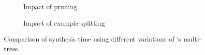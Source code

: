 \begin{figure}[t]
    \centering
    
    \begin{subfigure}[t]{0.47\textwidth}
         \centering
         \caption{Impact of pruning}
         \label{fig:mt_vs_nopruning}
     \end{subfigure}
     \hfill%
     \begin{subfigure}[t]{0.47
\textwidth}
         \centering
         \caption{Impact of example-splitting}
         \label{fig:mt_vs_dynamic}
     \end{subfigure}
\caption{Comparison of synthesis time using different variations of \Forest{}'s multi-trees.}
\label{fig:time-comparison-multitree}
\end{figure}